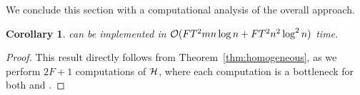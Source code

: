 \documentclass[conference]{IEEEtran}
\newcommand{\ksline}[2]{{\color{blue}#1}{\em \color{blue}[KS]: #2}}
\newcommand{\frline}[2]{{\color{blue}#1}{\em \color{blue}[FR]: #2}}
\newcommand{\ksline}[2]{#1}
\newcommand{\frline}[2]{#1}
\newtheorem{corollary}[theorem]{Corollary}
\begin{document}
We conclude this section with a computational analysis of the overall approach. 

\begin{corollary}
  \alg can be implemented in $\mathcal{O}(FT^2mn\log n+FT^2n^2\log^2n)$ time.
\end{corollary}
\begin{proof}
  This result directly follows from Theorem~\ref{thm:homogeneous}, as we perform $2F+1$ computations of $\mathcal{H}$, where each computation is a bottleneck for both \private and \shared. %
\end{proof}

\end{document}
